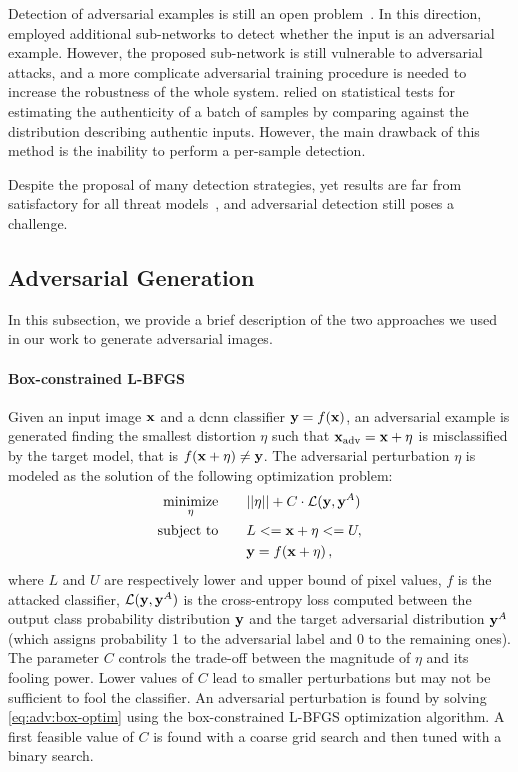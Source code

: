 Detection of adversarial examples is still an open problem~\cite{papernot2016limitations}.
In this direction, \citet{gong2017adversarial,metzen2017detecting} employed additional sub-networks to detect whether the input is an adversarial example.
However, the proposed sub-network is still vulnerable to adversarial attacks, and a more complicate adversarial training procedure is needed to increase the robustness of the whole system.
\citet{feinman2017detecting,grosse2017statistical} relied on statistical tests for estimating the authenticity of a batch of samples by comparing against the distribution describing authentic inputs.
However, the main drawback of this method is the inability to perform a per-sample detection.

Despite the proposal of many detection strategies, yet results are far from satisfactory for all threat models~\cite{carlini2017adversarial}, and adversarial detection still poses a challenge.

\subsection{Adversarial Generation}
\label{sec:adv:algos}
In this subsection, we provide a brief description of the two approaches %
we used in our work to generate adversarial images.
\paragraph{Box-constrained L-BFGS~\cite{tabacof2016exploring,szegedy2013intriguing}}
Given an input image $\mathbf{x}$ and a \gls{dcnn} classifier $\mathbf{y} = f(\mathbf{x})$, an adversarial example is generated finding the smallest distortion $\eta$ such that $\mathbf{x}_\text{adv} = \mathbf{x} + \eta$ is misclassified by the target model, that is $f(\mathbf{x}+\eta) \neq \mathbf{y}$.
The adversarial perturbation $\eta$ is modeled as the solution of the following optimization problem:
\begin{equation} \label{eq:adv:box-optim}
\begin{split}
\underset{\eta}{\text{minimize}}&\qquad ||\eta|| + C \cdot \mathcal{L}(\mathbf{y},\mathbf{y}^A) \\
\text{subject to} 				&\qquad L <= \mathbf{x}+\eta <= U, \\
                                &\qquad \mathbf{y} = f(\mathbf{x}+\eta) \,,
\end{split}
\end{equation}
where $L$ and $U$ are respectively lower and upper bound of pixel values, $f$ is the attacked classifier, $\mathcal{L}(\mathbf{y},\mathbf{y}^A)$ is the cross-entropy loss computed between the output class probability distribution $\mathbf{y}$ and the target adversarial distribution $\mathbf{y}^A$ (which assigns probability 1 to the adversarial label and 0 to the remaining ones).
The parameter $C$ controls the trade-off between the magnitude of $\eta$ and its fooling power.
Lower values of $C$ lead to smaller perturbations but may not be sufficient to fool the classifier.
An adversarial perturbation is found by solving \ref{eq:adv:box-optim} using the box-constrained L-BFGS optimization algorithm.
A first feasible value of $C$ is found with a coarse grid search and then tuned with a binary search.

